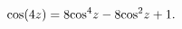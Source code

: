 \[\mathop{\cos\/}\nolimits\!\left(4z\right)=8{\mathop{\cos\/}\nolimits^{4}}z-8{%
\mathop{\cos\/}\nolimits^{2}}z+1.\]
